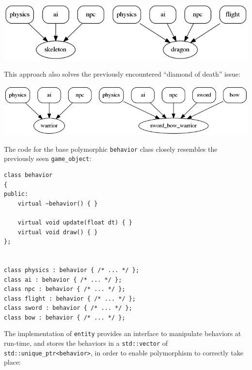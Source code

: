 \documentclass[oneside, 12pt, a4paper, openany]{book}
\let\origfigure=\figure
\let\endorigfigure=\endfigure
\renewenvironment{figure}[1][]{%
\origfigure[H]
}{%
\endorigfigure
}
\begin{document}
\begin{figure}[htbp]
\centering
\includegraphics{source/figures/generated/ecs/overview/oop_composition/example_rpg_0.png}
\caption{Object-oriented composition: RPG - skeleton and dragon}
\end{figure}

This approach also solves the previously encountered ``diamond of
death'' issue:

\begin{figure}[htbp]
\centering
\includegraphics{source/figures/generated/ecs/overview/oop_composition/example_rpg_1.png}
\caption{Object-oriented composition: RPG - unarmed and sword+bow
warrior}
\end{figure}

The code for the base polymorphic
\texttt{behavior}
class closely resembles the previously seen
\texttt{game_object}:

\begin{verbatim}
class behavior
{
public:
    virtual ~behavior() { }

    virtual void update(float dt) { }
    virtual void draw() { }
};


class physics : behavior { /* ... */ };
class ai : behavior { /* ... */ };
class npc : behavior { /* ... */ };
class flight : behavior { /* ... */ };
class sword : behavior { /* ... */ };
class bow : behavior { /* ... */ };
\end{verbatim}

The implementation of
\texttt{entity}
provides an interface to manipulate behaviors at run-time, and stores
the behaviors in a
\texttt{std::vector}
of
\texttt{std::unique_ptr<behavior>},
in order to enable polymorphism to correctly take place:
\end{document}
